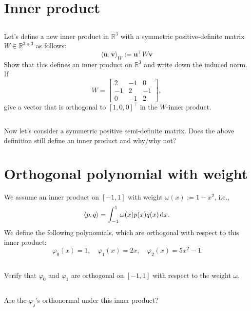 \documentclass[11pt,letterpaper]{article}
\begin{document}
 

\section{Inner product}
\subsection{}
Let's define a new inner product in $\mathbb R^3$ with a symmetric
  positive-definite matrix $W\in \mathbb R^{3\times 3}$ as follows:
  $$
  \langle \boldsymbol u, \boldsymbol v\rangle_W := \boldsymbol u^\top W \boldsymbol v
  $$
  Show that this defines an inner product on $\mathbb R^3$ and write
  down the induced norm. If 
  $$W=\begin{bmatrix}2& -1& 0 \\ -1 & 2 & -1
  \\ 0 & -1 & 2 \end{bmatrix},$$
  give a vector that is orthogonal to
  $[1,0,0]^\top$ in the $W$-inner product.

\subsection{}
Now let's consider a symmetric positive
  semi-definite matrix. Does the above definition still define an
  inner product and why/why not?


\section{Orthogonal polynomial with weight}
We assume
  an inner product on $[-1,1]$ with weight $\omega(x):=1-x^2$, i.e.,
  $$
  \langle p,q\rangle = \int_{-1}^1 \omega(x)p(x)q(x)\,\mathrm{d} x.
  $$ We define the following polynomials, which are orthogonal with
  respect to this inner product:
  $$
  \varphi_0(x) = 1, \quad \varphi_1(x) = 2x, \quad \varphi_2(x) = 5x^2-1
  $$

\subsection{}
Verify that $\varphi_0$ and $\varphi_1$ are orthogonal on $[-1,1]$
    with respect to the weight $\omega$.

\subsection{}
Are the $\varphi_j$'s orthonormal under this inner product?
\end{document}
